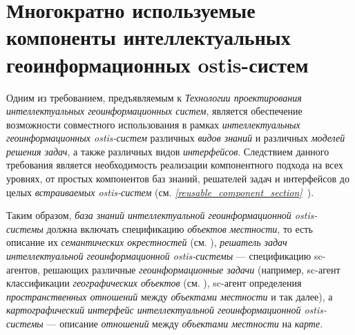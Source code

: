 \section{Многократно используемые компоненты интеллектуальных геоинформационных ostis-систем}
\label{chapter_gis_sec_mic_components}

Одним из требованием, предъявляемым к \textit{Технологии проектирования интеллектуальных геоинформационных систем}, является обеспечение возможности совместного использования в рамках \textit{интеллектуальных геоинформационных ostis-систем} различных \textit{видов знаний} и различных \textit{моделей решения задач}, а также различных видов \textit{интерфейсов}. Следствием данного требования является необходимость реализации компонентного подхода на всех уровнях, от простых компонентов баз знаний, решателей задач и интерфейсов до целых \textit{встраиваемых ostis-систем} (см. \textit{\ref{reusable_component_section}~}).

Таким образом, \textit{база знаний интеллектуальной геоинформационной ostis-системы} должна включать спецификацию \textit{объектов местности}, то есть описание их \textit{семантических окрестностей} (см. \textit{}), \textit{решатель задач интеллектуальной геоинформационной ostis-системы} --- спецификацию sc-агентов, решающих различные \textit{геоинформационные задачи} (например, sc-агент классификации \textit{географических объектов} (см. \textit{}), sc-агент определения \textit{пространственных отношений} между \textit{объектами местности} и так далее), а \textit{картографический интерфейс интеллектуальной геоинформационной ostis-системы} --- описание \textit{отношений} между \textit{объектами местности} на \textit{карте}.

